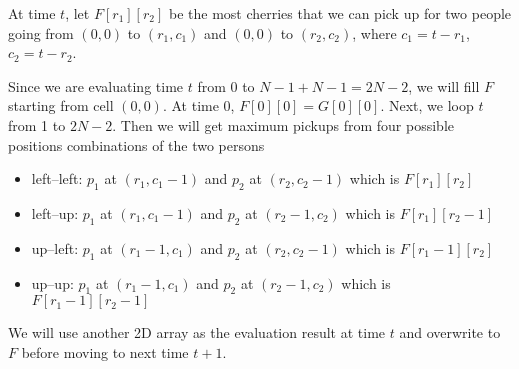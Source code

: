 At time $t$, let $F[r_1][r_2]$ be the most cherries that we can pick up for two people going from $(0, 0)$ to $(r_1, c_1)$ and $(0, 0)$ to $(r_2, c_2)$, where $c_1 = t-r_1$, $c_2 = t-r_2$. 

Since we are evaluating time $t$ from 0 to $N-1+N-1=2N-2$, we will fill $F$ starting from cell $(0,0)$. At time 0, $F[0][0]=G[0][0]$. Next, we loop $t$ from 1 to $2N-2$. Then we will get maximum pickups from four possible positions combinations of the two persons
\begin{itemize}
\item left--left: $p_1$ at $(r_1,c_1-1)$ and $p_2$ at $(r_2, c_2-1)$ which is $F[r_1][r_2]$
\item left--up: $p_1$ at $(r_1,c_1-1)$ and $p_2$ at $(r_2-1, c_2)$ which is $F[r_1][r_2-1]$
\item up--left: $p_1$ at $(r_1-1,c_1)$ and $p_2$ at $(r_2, c_2-1)$ which is $F[r_1-1][r_2]$
\item up--up: $p_1$ at $(r_1-1,c_1)$ and $p_2$ at $(r_2-1, c_2)$ which is $F[r_1-1][r_2-1]$
\end{itemize}

We will use another 2D array as the evaluation result at time $t$ and overwrite to $F$ before moving to next time $t+1$.


